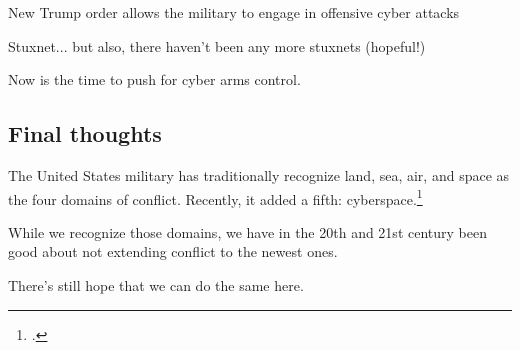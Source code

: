 \documentclass{memoir}
\begin{document}
New Trump order allows the military to engage in offensive cyber attacks

Stuxnet... but also, there haven't been any more stuxnets (hopeful!)

Now is the time to push for cyber arms control.

\subsection{Final thoughts}
The United States military has traditionally recognize land, sea, air, and space as the four domains of conflict. Recently, it added a fifth: cyberspace.\footcite{carafano_americas_2018}

While we recognize those domains, we have in the 20th and 21st century been good about not extending conflict to the newest ones.

There's still hope that we can do the same here.

\newpage
\printbibliography[heading=subbibliography]
\end{document}
